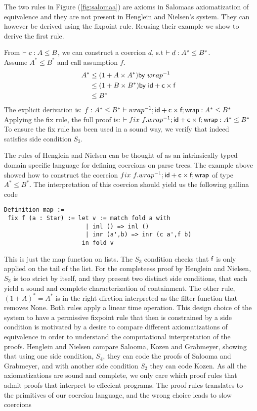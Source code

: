 \documentclass[a4paper,UKenglish,cleveref, autoref, thm-restate]{lipics-v2021}
\begin{document}
The two rules in Figure (\ref{fig:salomaa}) are axioms in Salomaas axiomatization of equivalence and they are not present in Henglein and Nielsen's system.
They can however be derived using the fixpoint rule. Reusing their example we show to derive the first rule.
\begin{example}
From $\contains{}{c}{A}{B}$, we can construct a coercion $d$, s.t $\contains{}{d}{A^*}{B^*}$.\\
Assume $A^* \leq B^*$ and call assumption $f$.
\begin{align}
  A^* &\leq (1 + A \times A^*) \textsf{by} ~\dslcominv{wrap}\\
&\leq  (1 + B \times B^*) \textsf{by} ~\dslcom{id}+ \dslcom{c} \times \dslcom{f}\\
&\leq B^*
\end{align}
The explicit derivation is:
$\contains{f : A^* \leq B^*}{\dslcominv{wrap} ; \dslcom{id} + \dslcom{c} \times \dslcom{f};  \dslcom{wrap}}{A^*}{B^*}$\\
Applying the fix rule, the full proof is:
$\contains{}{\fix~f. \dslcominv{wrap} ; \dslcom{id} + \dslcom{c} \times \dslcom{f};  \dslcom{wrap}}{A^*}{B^*}$\\
To ensure the fix rule has been used in a sound way, we verify that indeed satisfies side condition $S_3$.\\
\end{example}
The rules of Henglein and Nielsen can be thought of as an intrinsically typed domain specific language for defining coercions on parse trees.
The example above showed how to construct the coercion $\fix~f. \dslcominv{wrap} ; \dslcom{id} + \dslcom{c} \times \dslcom{f};  \dslcom{wrap}$ of type $A^* \leq B^*$. The interpretation of this coercion should yield us the following gallina code
\begin{verbatim}
Definition map := 
 fix f (a : Star) := let v := match fold a with 
                       | inl () => inl ()
                       | inr (a',b) => inr (c a',f b)
                      in fold v
\end{verbatim}
This is just the map function on lists. The $S_3$ condition checks that $\textsf{f}$ is only applied on the tail of the list. For the completeess proof by Henglein and Nielsen, $S_3$ is too strict by itself, and they present two distinct side conditions, that each yield a sound and complete characterization of containment. The other rule, $(1 + A)^* = A^*$ is in the right dirction interpreted as the filter function that removes \textsf{None}. Both rules apply a linear time operation.
 This design choice of the system to have a permissive fixpoint rule that then is constrained by a side condition is motivated by a desire to compare different axiomatizations of equivalence in order to understand the computational interpretation of the proofs. Henglein and Nielsen compare Salooma, Kozen and Grabmeyer, showing that using one side condition, $S_4$, they can code the proofs of Salooma and Grabmeyer, and with another side condition $S_2$ they can code Kozen. As all the axiomatizations are sound and complete, we only care which proof rules that admit proofs that interpret to effecient programs. The proof rules translates to the primitives of our coercion language, and the wrong choice leads to slow coercions
\end{document}

